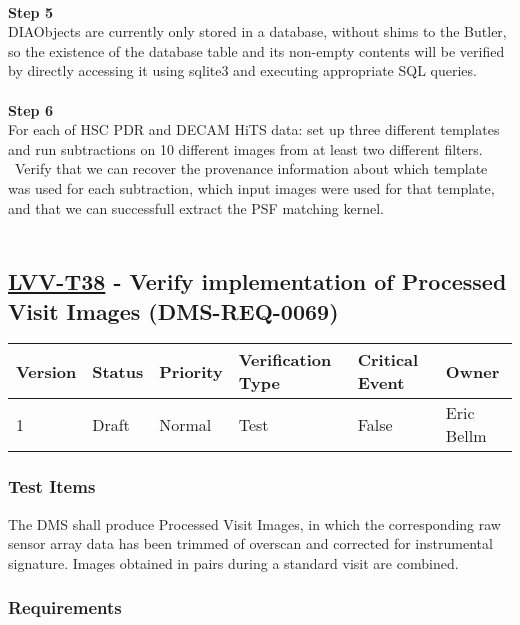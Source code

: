 ~\\
\textbf{Step 5}\\
DIAObjects are currently only stored in a database, without shims to the
Butler, so the existence of the database table and its non-empty
contents will be verified by directly accessing it using sqlite3 and
executing appropriate SQL queries.\\
~\\
\textbf{Step 6}\\
For each of HSC PDR and DECAM HiTS data: set up three different
templates and run subtractions on 10 different images from at least two
different filters. ~Verify that we can recover the provenance
information about which template was used for each subtraction, which
input images were used for that template, and that we can successfull
extract the PSF matching kernel.\\
~\\

\hypertarget{lvv-t38---verify-implementation-of-processed-visit-images-dms-req-0069}{%
\subsection{\texorpdfstring{\href{https://jira.lsstcorp.org/secure/Tests.jspa\#/testCase/LVV-T38}{LVV-T38}
- Verify implementation of Processed Visit Images
(DMS-REQ-0069)}{LVV-T38 - Verify implementation of Processed Visit Images (DMS-REQ-0069)}}\label{lvv-t38---verify-implementation-of-processed-visit-images-dms-req-0069}}

\begin{longtable}[]{@{}llllll@{}}
\toprule
Version & Status & Priority & Verification Type & Critical Event &
Owner\tabularnewline
\midrule
\endhead
1 & Draft & Normal & Test & False & Eric Bellm\tabularnewline
\bottomrule
\end{longtable}

\hypertarget{test-items-127}{%
\subsubsection{Test Items}\label{test-items-127}}

The DMS shall produce Processed Visit Images, in which the corresponding
raw sensor array data has been trimmed of overscan and corrected for
instrumental signature. Images obtained in pairs during a standard visit
are combined.

\hypertarget{requirements-128}{%
\subsubsection{Requirements}\label{requirements-128}}

